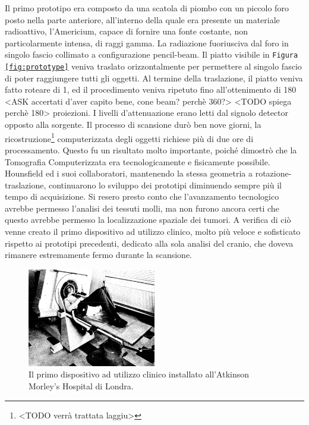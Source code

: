 \documentclass[a4paper,12pt, doubleside]{report}
\begin{document}
                    Il primo prototipo era composto da una scatola di piombo con un piccolo foro posto nella parte anteriore, all’interno della quale era presente un materiale radioattivo, l’Americium, capace di fornire una fonte costante, non particolarmente intensa, di raggi gamma. La radiazione fuoriusciva dal foro in singolo fascio collimato a configurazione pencil-beam. Il piatto visibile in \texttt{Figura \ref{fig:prototype}} veniva traslato orizzontalmente per permettere al singolo fascio di poter raggiungere tutti gli oggetti. Al termine della traslazione, il piatto veniva fatto roteare di 1\degree, ed il procedimento veniva ripetuto fino all'ottenimento di 180 <ASK accertati d'aver capito bene, cone beam? perchè 360?> <TODO spiega perchè 180> proiezioni. I livelli d'attenuazione erano letti dal signolo detector opposto alla sorgente. Il processo di scansione durò ben nove giorni, la ricostruzione\footnote{<TODO verrà trattata laggiu>} computerizzata degli oggetti richiese più di due ore di processamento. Questo fu un risultato molto importante, poiché dimostrò che la Tomografia Computerizzata era tecnologicamente e fisicamente possibile.
                    Hounsfield ed i suoi collaboratori, mantenendo la stessa geometria a rotazione-traslazione, continuarono lo sviluppo dei prototipi diminuendo sempre più il tempo di acquisizione. Si resero presto conto che l'avanzamento tecnologico avrebbe permesso l'analisi dei tessuti molli, ma non furono ancora certi che questo avrebbe permesso la localizzazione spaziale dei tumori. A verifica di ciò venne creato il primo dispositivo ad utilizzo clinico, molto più veloce e sofisticato rispetto ai prototipi precedenti, dedicato alla sola analisi del cranio, che doveva rimanere estremamente fermo durante la scansione.
                            
                    \begin{figure}[h]
                        \centering
                        \includegraphics[width=0.5\textwidth]{clinical}
                        \caption{Il primo dispositivo ad utilizzo clinico installato all'Atkinson Morley’s Hospital di Londra.}
                        \label{fig:clinical}
                    \end{figure}
                            
\end{document}
